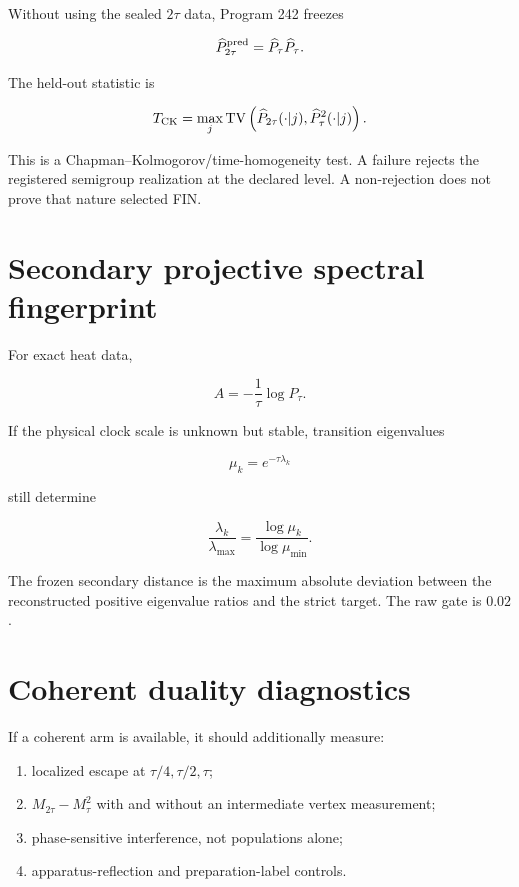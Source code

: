 \documentclass[11pt,a4paper,openany]{report}
\begin{document}
Without using the sealed \(2\tau\) data, Program 242 freezes

\[
\widehat P_{2\tau}^{\rm pred}
=
\widehat P_\tau\widehat P_\tau.
\]

The held-out statistic is

\[
T_{\rm CK}
=
\max_j
\operatorname{TV}
\left(
\widehat P_{2\tau}(\cdot|j),
\widehat P_\tau^2(\cdot|j)
\right).
\]

This is a Chapman--Kolmogorov/\allowbreak{}time-homogeneity test. A failure rejects the registered semigroup realization at the declared level. A non-rejection does not prove that nature selected FIN.

\section{Secondary projective spectral fingerprint}

For exact heat data,

\[
A=-\frac1\tau\log P_\tau.
\]

If the physical clock scale is unknown but stable, transition eigenvalues

\[
\mu_k=e^{-\tau\lambda_k}
\]

still determine

\[
\frac{\lambda_k}{\lambda_{\max}}
=
\frac{\log\mu_k}{\log\mu_{\min}}.
\]

The frozen secondary distance is the maximum absolute deviation between the reconstructed positive eigenvalue ratios and the strict target. The raw gate is \(0.02\).

\section{Coherent duality diagnostics}

If a coherent arm is available, it should additionally measure:

\begin{enumerate}
\item 
localized escape at \(\tau/4,\tau/2,\tau\);

\item 
\(M_{2\tau}-M_\tau^2\) with and without an intermediate vertex measurement;

\item 
phase-sensitive interference, not populations alone;

\item 
apparatus-reflection and preparation-label controls.

\end{enumerate}
\end{document}
